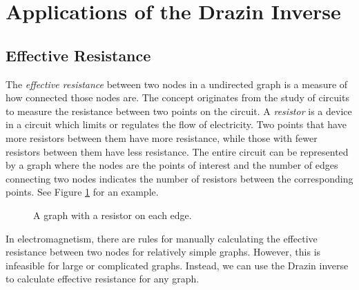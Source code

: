 \section*{Applications of the Drazin Inverse} %

\subsection*{Effective Resistance} %

The \emph{effective resistance} between two nodes in a undirected graph is a measure of how connected those nodes are.
The concept originates from the study of circuits to measure the resistance between two points on the circuit.
A \emph{resistor} is a device in a circuit which limits or regulates the flow of electricity.
Two points that have more resistors between them have more resistance, while those with fewer resistors between them have less resistance.
The entire circuit can be represented by a graph where the nodes are the points of interest and the number of edges connecting two nodes indicates the number of resistors between the corresponding points.
See Figure \ref{fig:resistors} for an example.

\begin{center}
\begin{figure}[H]
\caption{A graph with a resistor on each edge.}
\label{fig:resistors}
\end{figure}
\end{center}

In electromagnetism, there are rules for manually calculating the effective resistance between two nodes for relatively simple graphs.
However, this is infeasible for large or complicated graphs.
Instead, we can use the Drazin inverse to calculate effective resistance for any graph.

